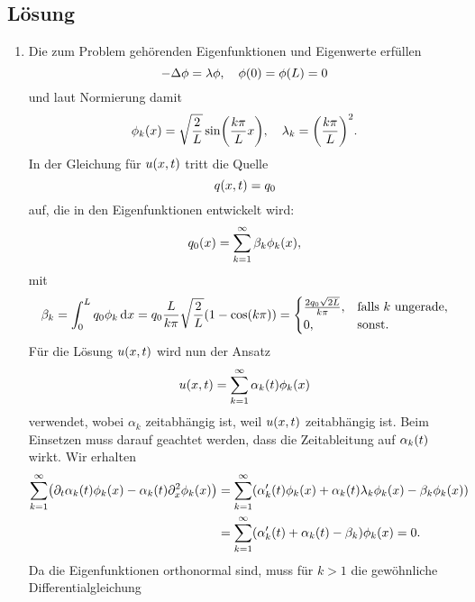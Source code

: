 \documentclass{exercise}
\begin{document}
    \subsection*{Lösung}
    \begin{enumerate}
        \item Die zum Problem gehörenden Eigenfunktionen und Eigenwerte erfüllen
        \[
            -\Delta\phi = \lambda\phi, \quad \phi\parentheses*{0} = \phi\parentheses*{L} = 0
        \]
        und laut Normierung damit
        \[
            \phi_k\parentheses*{x} = \sqrt{\frac{2}{L}}\sin\parentheses*{\frac{k\pi}{L}x}, \quad \lambda_k = \parentheses*{\frac{k\pi}{L}}^2.
        \]
        In der Gleichung für \(u\parentheses*{x, t}\) tritt die Quelle
        \[
            q\parentheses*{x, t} = q_0
        \]
        auf, die in den Eigenfunktionen entwickelt wird:
        \[
            q_0\parentheses*{x} = \sum_{k = 1}^\infty \beta_k \phi_k\parentheses*{x},
        \]
        mit
        \[
            \beta_k = \int_0^L q_0\phi_k\d x = q_0\frac{L}{k\pi}\sqrt{\frac{2}{L}}\parentheses*{1 - \cos\parentheses*{k\pi}} = \begin{cases}
                \frac{2q_0\sqrt{2L}}{k\pi}, & \text{falls }k\text{ ungerade},\\
                0, & \text{sonst}.
            \end{cases}
        \]
        Für die Lösung \(u\parentheses*{x, t}\) wird nun der Ansatz
        \[
            u\parentheses*{x, t} = \sum_{k = 1}^\infty \alpha_k\parentheses*{t}\phi_k\parentheses*{x}
        \]
        verwendet, wobei \(\alpha_k\) zeitabhängig ist, weil \(u\parentheses*{x, t}\) zeitabhängig ist.
        Beim Einsetzen muss darauf geachtet werden, dass die Zeitableitung auf \(\alpha_k\parentheses*{t}\) wirkt.
        Wir erhalten
        \begin{align*}
            \sum_{k = 1}^\infty \parentheses*{\partial_t \alpha_k\parentheses*{t}\phi_k\parentheses*{x} - \alpha_k\parentheses*{t}\partial_x^2 \phi_k\parentheses*{x}} &= \sum_{k = 1}^\infty \parentheses*{\alpha_k'\parentheses*{t}\phi_k\parentheses*{x} + \alpha_k\parentheses*{t}\lambda_k \phi_k\parentheses*{x} - \beta_k \phi_k\parentheses*{x}}\\
            &= \sum_{k = 1}^\infty \parentheses*{\alpha_k'\parentheses*{t} + \alpha_k\parentheses*{t} - \beta_k}\phi_k\parentheses*{x} = 0.
        \end{align*}
        Da die Eigenfunktionen orthonormal sind, muss für \(k > 1\) die gewöhnliche Differentialgleichung

\end{enumerate}
\end{document}
